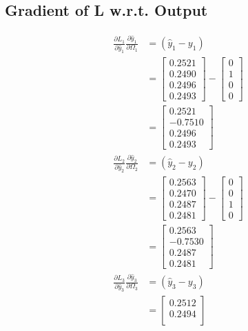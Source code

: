 \documentclass{article}
\begin{document}
\subsection{Gradient of L w.r.t. Output}
\begin{align*}
\frac{\partial L_1}{\partial \hat{y}_1}\frac{\partial \hat{y}_1}{\partial \Omega_1} &= (\hat{y}_{1}-y_{1})\\
&= \begin{bmatrix} 0.2521 \\
0.2490 \\
0.2496 \\
0.2493
\end{bmatrix} - \begin{bmatrix} 0 \\ 1 \\ 0 \\ 0 \end{bmatrix} \\
&=\begin{bmatrix} 0.2521 \\
-0.7510 \\
0.2496 \\
0.2493
\end{bmatrix}  \\
\frac{\partial L_2}{\partial \hat{y}_2}\frac{\partial \hat{y}_2}{\partial \Omega_2} &= (\hat{y}_{2}-y_{2})\\
&= \begin{bmatrix}
0.2563 \\
0.2470 \\
0.2487 \\
0.2481
\end{bmatrix} - \begin{bmatrix} 0 \\ 0 \\ 1 \\ 0 \end{bmatrix}\\
&= \begin{bmatrix}
0.2563 \\
-0.7530 \\
0.2487 \\
0.2481
\end{bmatrix} \\
\frac{\partial L_3}{\partial \hat{y}_3}\frac{\partial \hat{y}_3}{\partial \Omega_3} &= (\hat{y}_{3}-y_{3})\\
&=  \begin{bmatrix}
0.2512 \\
0.2494 \\

\end{bmatrix}
\end{align*}
\end{document}
